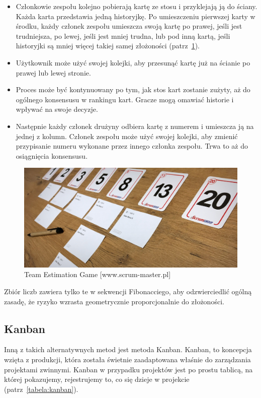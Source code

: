 \begin{itemize}
	\item Członkowie zespołu kolejno pobierają kartę ze stosu i przyklejają ją do ściany.
	Każda karta przedstawia jedną historyjkę.
	Po umieszczeniu pierwszej karty w środku, każdy członek zespołu umieszcza swoją kartę po prawej,
	jeśli jest trudniejsza, po lewej, jeśli jest mniej trudna,
	lub pod inną kartą, jeśli historyjki są mniej więcej takiej samej złożoności
	(patrz~\ref{rys:teamEstimationGame}).
	\item Użytkownik może użyć swojej kolejki, aby przesunąć kartę już na ścianie po prawej lub lewej stronie.
	\item Proces może być kontynuowany po tym, jak stos kart zostanie zużyty,
	aż do ogólnego konsensusu w rankingu kart. Gracze mogą omawiać historie i wpływać na swoje decyzje.
	\item Następnie każdy członek drużyny odbiera kartę z numerem i umieszcza ją na jednej z kolumn.
	Członek zespołu może użyć swojej kolejki, aby zmienić przypisanie numeru
	wykonane przez innego członka zespołu. Trwa to aż do osiągnięcia konsensusu.
\end{itemize}

\begin{figure}[H]
	\centering\includegraphics[width=.6\textwidth]{img/team_estimation_game}
	\caption{Team Estimation Game [www.scrum-master.pl]}\label{rys:teamEstimationGame}
\end{figure}

Zbiór liczb zawiera tylko te w sekwencji Fibonacciego, aby odzwierciedlić ogólną zasadę,
że ryzyko wzrasta geometrycznie proporcjonalnie do złożoności.

\subsection{Kanban}

Inną z takich alternatywnych metod jest metoda Kanban. Kanban, to koncepcja wzięta z produkcji,
która została świetnie zaadaptowana właśnie do zarządzania projektami zwinnymi.
Kanban w przypadku projektów jest po prostu tablicą, na której pokazujemy,
rejestrujemy to, co się dzieje w projekcie (patrz~\ref{tabela:kanban}).

